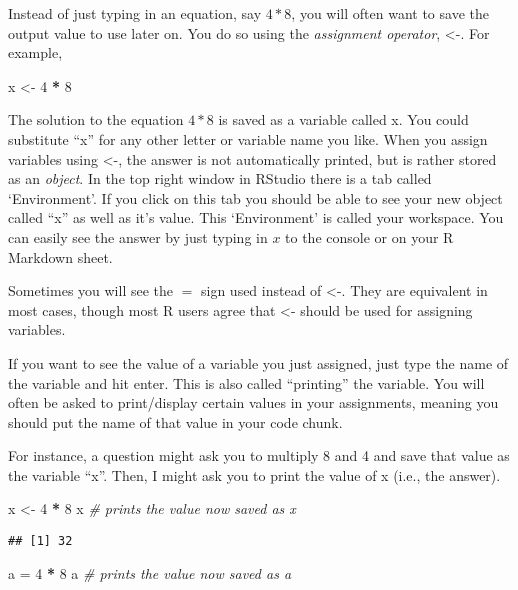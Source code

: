 \documentclass[]{article}
\newenvironment{Shaded}{\begin{snugshade}}{\end{snugshade}}
\newcommand{\CommentTok}[1]{\textcolor[rgb]{0.56,0.35,0.01}{\textit{#1}}}
\newcommand{\DecValTok}[1]{\textcolor[rgb]{0.00,0.00,0.81}{#1}}
\newcommand{\NormalTok}[1]{#1}
\newcommand{\OperatorTok}[1]{\textcolor[rgb]{0.81,0.36,0.00}{\textbf{#1}}}
\newcommand{\StringTok}[1]{\textcolor[rgb]{0.31,0.60,0.02}{#1}}
\begin{document}
Instead of just typing in an equation, say \(4 * 8\), you will often
want to save the output value to use later on. You do so using the
\emph{assignment operator}, \textless{}-. For example,

\begin{Shaded}
\begin{Highlighting}[]
\NormalTok{x <-}\StringTok{ }\DecValTok{4} \OperatorTok{*}\StringTok{ }\DecValTok{8}
\end{Highlighting}
\end{Shaded}

The solution to the equation \(4*8\) is saved as a variable called x.
You could substitute ``x'' for any other letter or variable name you
like. When you assign variables using \textless{}-, the answer is not
automatically printed, but is rather stored as an \emph{object}. In the
top right window in RStudio there is a tab called `Environment'. If you
click on this tab you should be able to see your new object called ``x''
as well as it's value. This `Environment' is called your workspace. You
can easily see the answer by just typing in \(x\) to the console or on
your R Markdown sheet.

Sometimes you will see the \(=\) sign used instead of \textless{}-. They
are equivalent in most cases, though most R users agree that
\textless{}- should be used for assigning variables.

If you want to see the value of a variable you just assigned, just type
the name of the variable and hit enter. This is also called ``printing''
the variable. You will often be asked to print/display certain values in
your assignments, meaning you should put the name of that value in your
code chunk.

For instance, a question might ask you to multiply 8 and 4 and save that
value as the variable ``x''. Then, I might ask you to print the value of
x (i.e., the answer).

\begin{Shaded}
\begin{Highlighting}[]
\NormalTok{x <-}\StringTok{ }\DecValTok{4} \OperatorTok{*}\StringTok{ }\DecValTok{8}
\NormalTok{x }\CommentTok{# prints the value now saved as x }
\end{Highlighting}
\end{Shaded}

\begin{verbatim}
## [1] 32
\end{verbatim}

\begin{Shaded}
\begin{Highlighting}[]
\NormalTok{a =}\StringTok{ }\DecValTok{4} \OperatorTok{*}\StringTok{ }\DecValTok{8}
\NormalTok{a }\CommentTok{# prints the value now saved as a}
\end{Highlighting}
\end{Shaded}
\end{document}
